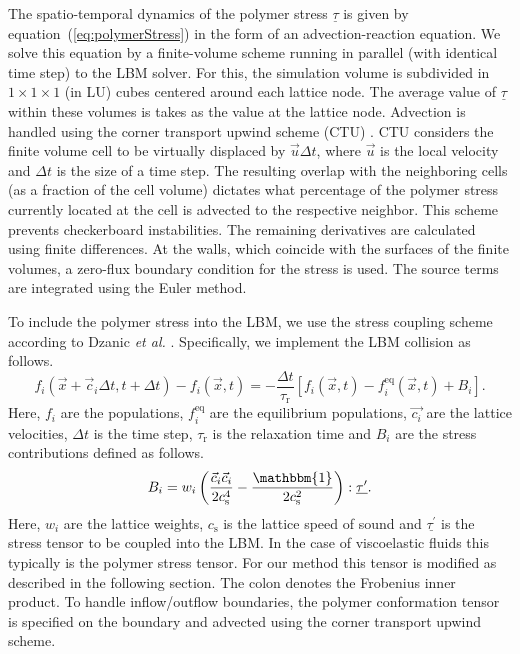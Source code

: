 \documentclass[a4paper,12pt]{scrartcl}
\newcommand{\ma}[1]{\underline{#1}}
\newcommand{\uT}{\mathbbm{1}}
\begin{document}
The spatio-temporal dynamics of the polymer stress $\ma{\tau}$ is given by equation~(\ref{eq:polymerStress}) in the form of an advection-reaction equation.
We solve this equation by a finite-volume scheme running in parallel (with identical time step) to the LBM solver. For this, the simulation volume is subdivided in $1\times1\times1$ (in LU) cubes centered around each lattice node. The average value of $\ma{\tau}$ within these volumes is takes as the value at the lattice node.
Advection is handled using the corner transport upwind scheme (CTU) \cite{kuron2021}. CTU considers the finite volume cell to be virtually displaced by $\vec{u}\Delta t$, where $\vec{u}$ is the local velocity and $\Delta t$ is the size of a time step. The resulting overlap with the neighboring cells (as a fraction of the cell volume) dictates what percentage of the polymer stress currently located at the cell is advected to the respective neighbor. This scheme prevents checkerboard instabilities.
The remaining derivatives are calculated using finite differences.
At the walls, which coincide with the surfaces of the finite volumes, a zero-flux boundary condition for the stress is used.
The source terms are integrated using the Euler method.

To include the polymer stress into the LBM, we use the stress coupling scheme according to Dzanic \textit{et al.} \cite{dzanic2022_2, gupta2015, onishi2006}.
Specifically, we implement the LBM collision as follows.
\begin{equation}
	f_i\left(\vec{x}+\vec{c}_i\Delta t, t+\Delta t\right) - f_i\left(\vec{x}, t\right) = -\frac{\Delta t}{\tau_\text{r}}\left[f_i\left(\vec{x}, t\right) - f_i^\text{eq}\left(\vec{x}, t\right) + B_i\right].
\end{equation}
Here, $f_i$ are the populations, $f_i^\text{eq}$ are the equilibrium populations, $\vec{c_i}$ are the lattice velocities, $\Delta t$ is the time step, $\tau_\text{r}$ is the relaxation time and $B_i$ are the stress contributions defined as follows.
\begin{equation}
	B_i = w_i\left(\frac{\vec{c}_i\vec{c}_i}{2c_\text{s}^4}-\frac{\uT}{2c_\text{s}^2}\right):\ma{\tau^\prime}.
\end{equation}
Here, $w_i$ are the lattice weights, $c_\text{s}$ is the lattice speed of sound and $\ma{\tau^\prime}$ is the stress tensor to be coupled into the LBM. In the case of viscoelastic fluids this typically is the polymer stress tensor. For our method this tensor is modified as described in the following section. The colon denotes the Frobenius inner product.
To handle inflow/outflow boundaries, the polymer conformation tensor is specified on the boundary and advected using the corner transport upwind scheme.
\end{document}
